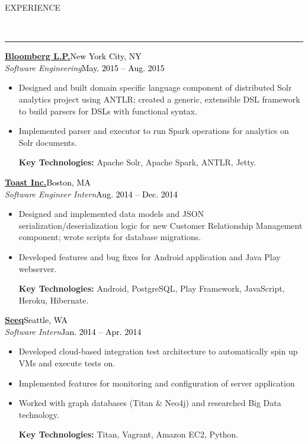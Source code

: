 \documentclass[11pt, letterpaper, oneside]{article}
\newcommand{\HRule}[2]{\textcolor{#1}{\rule{\linewidth}{#2}}}
\newcommand{\sectiontitle}[1]{\begin{minipage}{\textwidth}\vspace{-7.5pt}\begin{flushleft}\hspace{-20.5pt}\vspace{-25pt}
\Large\MakeUppercase{#1}\end{flushleft}\end{minipage}\\\HRule{black}{0.15mm}\vspace{\baselineskip}}
\newenvironment{ressection}[1]{
  \sectiontitle{#1}}
  {\vspace{-\baselineskip}}
\newcommand{\resentryheader}[4]{
    \vspace{-6pt}
    \textbf{#1}\hspace{\stretch{1}}\textcolor{black}{#3}\\
    \textit{#2}\hspace{\stretch{1}}\textcolor{black}{#4}\\
}
\newcommand{\resitem}[1]{
    \vspace{2pt}
    \item \begin{flushleft} #1 \end{flushleft}
}
\newenvironment{resentry}[4]{
  \begin{minipage}{\textwidth}
  \vspace{-3pt}
    \resentryheader{#1}{#2}{#3}{#4}
        \vspace{-\baselineskip}
    \begin{itemize}[noitemsep,nolistsep]
}{
    \end{itemize}
        \vspace{\baselineskip}
        \end{minipage}
}
\begin{document}
\begin{ressection}{Experience}
  \begin{resentry}{\href{http://www.bloomberg.com/professional/}{Bloomberg L.P.}}{Software Engineering}{New York City, NY}{May. 2015 -- Aug. 2015}
    \resitem{Designed and built domain specific language component of distributed Solr analytics project using ANTLR; created a generic, extensible DSL framework to build parsers for DSLs with functional syntax.}
    \resitem{Implemented parser and executor to run Spark operations for analytics on Solr documents.}
    \vspace{2pt} \hspace{-15pt}
    \textbf{Key Technologies:} Apache Solr, Apache Spark, ANTLR, Jetty.
    \vspace{2pt} 
  \end{resentry}  
  \begin{resentry}{\href{http://pos.toasttab.com/}{Toast Inc.}}{Software Engineer Intern}{Boston, MA}{Aug. 2014 -- Dec. 2014}
   \resitem{Designed and implemented data models and JSON serialization/deserialization logic for new Customer Relationship Management component; wrote scripts for database migrations. }
    \resitem{Developed features and bug fixes for Android application and Java Play webserver.}
    \vspace{2pt}  \hspace{-15pt}
    \textbf{Key Technologies:} Android, PostgreSQL, Play Framework, JavaScript, Heroku, Hibernate.
	\vspace{2pt}   
  \end{resentry}  
  \begin{resentry}{\href{http://www.seeq.com/}{Seeq}}{Software Intern}{Seattle, WA}{Jan. 2014 -- Apr. 2014}
    \resitem{Developed cloud-based integration test architecture to automatically spin up VMs and execute tests on.}
    \resitem{Implemented features for monitoring and configuration of server application}
    \resitem{Worked with graph databases (Titan \& Neo4j) and researched Big Data technology.}
    \vspace{2pt} \hspace{-15pt}
    \textbf{Key Technologies:} Titan, Vagrant, Amazon EC2, Python.
	\vspace{2pt}   
  \end{resentry}
\end{ressection}
\end{document}
